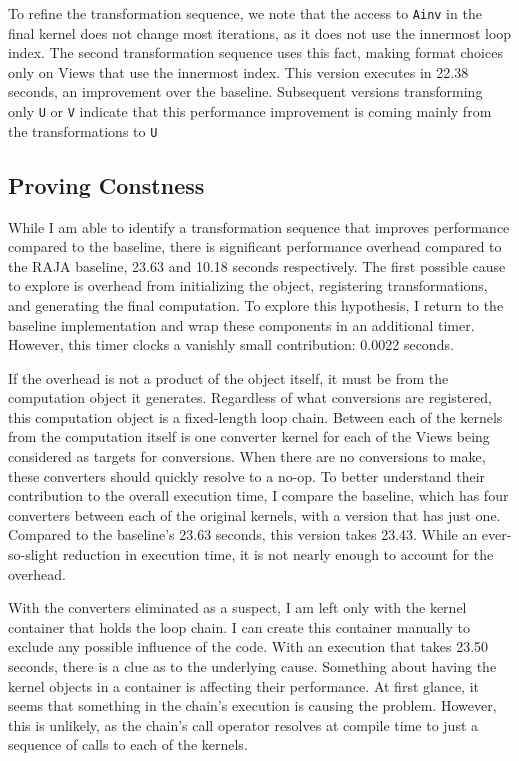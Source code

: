 To refine the transformation sequence, we note that the access to \verb.Ainv. in the final kernel does not change most iterations, as it does not use the innermost loop index. 
The second transformation sequence uses this fact, making format choices only on Views that use the innermost index. 
This version executes in 22.38 seconds, an improvement over the \FormatDecisions{} baseline. 
Subsequent versions transforming only \verb.U. or \verb.V. indicate that this performance improvement is coming mainly from the transformations to \verb.U.

\subsection{Proving Constness}

While I am able to identify a transformation sequence that improves performance compared to the \FormatDecisions{} baseline, there is significant performance overhead compared to the RAJA baseline, 23.63 and 10.18 seconds respectively.
The first possible cause to explore is overhead from initializing the \FormatDecisions{} object, registering transformations, and generating the final computation. 
To explore this hypothesis, I return to the baseline implementation and wrap these components in an additional timer. 
However, this timer clocks a vanishly small contribution: 0.0022 seconds.

If the overhead is not a product of the \FormatDecisions{} object itself, it must be from the computation object it generates.
Regardless of what conversions are registered, this computation object is a fixed-length loop chain.
Between each of the kernels from the computation itself is one converter kernel for each of the Views being considered as targets for conversions.
When there are no conversions to make, these converters should quickly resolve to a no-op.
To better understand their contribution to the overall execution time, I compare the baseline, which has four converters between each of the original kernels, with a version that has just one.
Compared to the baseline's 23.63 seconds, this version takes 23.43.
While an ever-so-slight reduction in execution time, it is not nearly enough to account for the overhead.

With the converters eliminated as a suspect, I am left only with the kernel container that holds the loop chain.
I can create this container manually to exclude any possible influence of the \FormatDecisions{} code.
With an execution that takes 23.50 seconds, there is a clue as to the underlying cause.
Something about having the kernel objects in a container is affecting their performance.
At first glance, it seems that something in the chain's execution is causing the problem.
However, this is unlikely, as the chain's call operator resolves at compile time to just a sequence of calls to each of the kernels.

